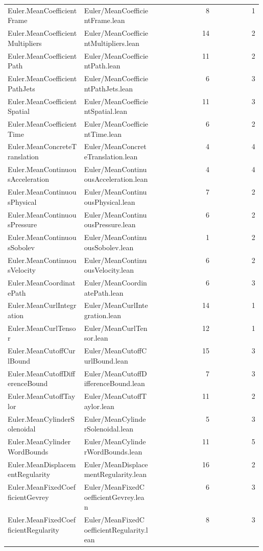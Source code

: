 \begin{longtable}{p{0.30\linewidth}p{0.28\linewidth}rr}
Euler.MeanCoefficientFrame & Euler/MeanCoefficientFrame.lean & 8 & 1\\
Euler.MeanCoefficientMultipliers & Euler/MeanCoefficientMultipliers.lean & 14 & 2\\
Euler.MeanCoefficientPath & Euler/MeanCoefficientPath.lean & 11 & 2\\
Euler.MeanCoefficientPathJets & Euler/MeanCoefficientPathJets.lean & 6 & 3\\
Euler.MeanCoefficientSpatial & Euler/MeanCoefficientSpatial.lean & 11 & 3\\
Euler.MeanCoefficientTime & Euler/MeanCoefficientTime.lean & 6 & 2\\
Euler.MeanConcreteTranslation & Euler/MeanConcreteTranslation.lean & 4 & 4\\
Euler.MeanContinuousAcceleration & Euler/MeanContinuousAcceleration.lean & 4 & 4\\
Euler.MeanContinuousPhysical & Euler/MeanContinuousPhysical.lean & 7 & 2\\
Euler.MeanContinuousPressure & Euler/MeanContinuousPressure.lean & 6 & 2\\
Euler.MeanContinuousSobolev & Euler/MeanContinuousSobolev.lean & 1 & 2\\
Euler.MeanContinuousVelocity & Euler/MeanContinuousVelocity.lean & 6 & 2\\
Euler.MeanCoordinatePath & Euler/MeanCoordinatePath.lean & 6 & 3\\
Euler.MeanCurlIntegration & Euler/MeanCurlIntegration.lean & 14 & 1\\
Euler.MeanCurlTensor & Euler/MeanCurlTensor.lean & 12 & 1\\
Euler.MeanCutoffCurlBound & Euler/MeanCutoffCurlBound.lean & 15 & 3\\
Euler.MeanCutoffDifferenceBound & Euler/MeanCutoffDifferenceBound.lean & 7 & 3\\
Euler.MeanCutoffTaylor & Euler/MeanCutoffTaylor.lean & 11 & 2\\
Euler.MeanCylinderSolenoidal & Euler/MeanCylinderSolenoidal.lean & 5 & 3\\
Euler.MeanCylinderWordBounds & Euler/MeanCylinderWordBounds.lean & 11 & 5\\
Euler.MeanDisplacementRegularity & Euler/MeanDisplacementRegularity.lean & 16 & 2\\
Euler.MeanFixedCoefficientGevrey & Euler/MeanFixedCoefficientGevrey.lean & 6 & 3\\
Euler.MeanFixedCoefficientRegularity & Euler/MeanFixedCoefficientRegularity.lean & 8 & 3\\

\end{longtable}
